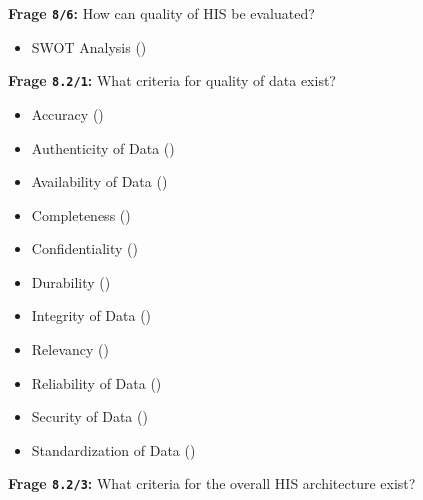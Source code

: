 \textbf{Frage \texttt{8/6}:} How can quality of HIS be evaluated?

\begin{itemize}
  \item SWOT Analysis ()
\end{itemize}

\textbf{Frage \texttt{8.2/1}:} What criteria for quality of data exist?

\begin{itemize}
  \item Accuracy ()
  \item Authenticity of Data ()
  \item Availability of Data ()
  \item Completeness ()
  \item Confidentiality ()
  \item Durability ()
  \item Integrity of Data ()
  \item Relevancy ()
  \item Reliability of Data ()
  \item Security of Data ()
  \item Standardization of Data ()
\end{itemize}

\textbf{Frage \texttt{8.2/3}:} What criteria for the overall HIS architecture exist?

